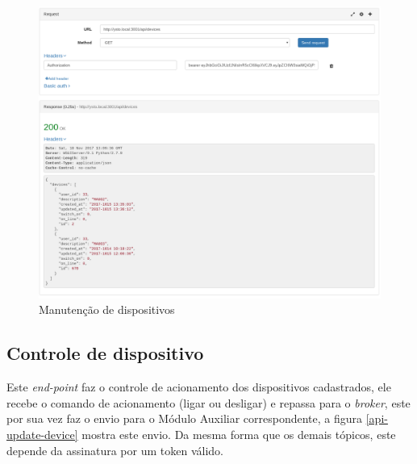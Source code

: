 \begin{figure}[H]
\caption{\label{api-devices} Manutenção de dispositivos}
\includegraphics[scale=0.30]{img/08-api-devices.png}
\end{figure}

\subsection{Controle de dispositivo}
Este \textit{end-point} faz o controle de acionamento dos dispositivos cadastrados, ele recebe o comando de acionamento (ligar ou desligar) e repassa para o \textit{broker}, este por sua vez faz o envio para o Módulo Auxiliar correspondente, a figura \ref{api-update-device} mostra este envio. Da mesma forma que os demais tópicos, este depende da assinatura por um token válido.

